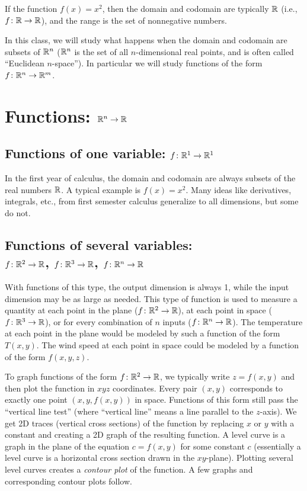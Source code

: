 \begin{example}
  If the function $f(x)=x^2$, then the domain and codomain are typically
  $\mathbb{R}$ (i.e., $f\colon \mathbb{R} \to \mathbb{R}$), and the range is the set of nonnegative numbers.
\end{example}

In this class, we will study what happens when the domain and codomain
are subsets of {${\mathbb{R}}^n$} ($\mathbb{R}^n$ is the set of all $n$-dimensional
real points, and is often called ``Euclidean {$n$}-space''). In
particular we will study functions of the form $f\colon {\ensuremath{\mathbb{R}}}^n\to
{\ensuremath{\mathbb{R}}}^m$.

\section{Functions: $\mathbb{R}^n\to \mathbb{R}$}
\subsection{Functions of one variable: $f\colon \mathbb{R}^1\to  \mathbb{R}^1$}
In the first year of calculus, the domain and codomain are always
subsets of the real numbers {$\mathbb{R}$}.  A typical example is $f(x)=x^2$.
Many ideas like derivatives, integrals, etc., from first semester
calculus generalize to all dimensions, but some do not.

\subsection{Functions of several variables: \\ $f\colon \mathbb{R}^2\to \mathbb{R}$, $f\colon \mathbb{R}^3\to \mathbb{R}$, $f\colon \mathbb{R}^n\to \mathbb{R}$} 

With functions of this type, the output dimension is always 1, while
the input dimension may be as large as needed. This type of function
is used to measure a quantity at each point in the plane ($f\colon {\ensuremath{\mathbb{R}}}^2\to
{\ensuremath{\mathbb{R}}}$), at each point in space ($f\colon {\ensuremath{\mathbb{R}}}^3\to {\ensuremath{\mathbb{R}}}$), or for every
combination of $n$ inputs ($f\colon {\ensuremath{\mathbb{R}}}^n\to {\ensuremath{\mathbb{R}}}$). The temperature at
each point in the plane would be modeled by such a function of the
form $T(x,y)$. The wind speed at each point in space could be modeled
by a function of the form $f(x,y,z)$.

To graph functions of the form {$f\colon {\ensuremath{\mathbb{R}}}^2\to {\ensuremath{\mathbb{R}}}$}, we typically
write $z=f(x,y)$ and then plot the function in $xyz$ coordinates.
Every pair $(x,y)$ corresponds to exactly one point $(x,y,f(x,y))$ in
space.  Functions of this form still pass the ``vertical line test''
(where ``vertical line'' means a line parallel to the $z$-axis).  We
get 2D traces (vertical cross sections) of the function by replacing
$x$ or $y$ with a constant and creating a 2D graph of the resulting
function.  A level curve is a graph in the plane of the equation
$c=f(x,y)$ for some constant $c$ (essentially a level curve is a
horizontal cross section drawn in the $xy$-plane). Plotting several
level curves creates a \emph{contour plot} of the function.  A few
graphs and corresponding contour plots follow.


